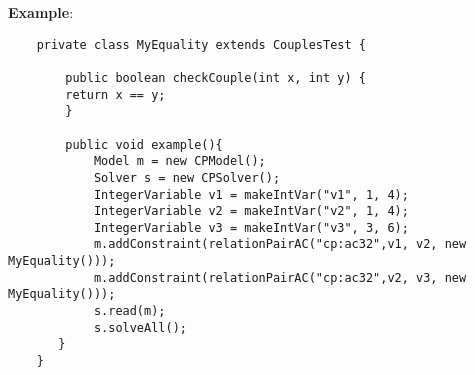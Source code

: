 \textbf{Example}:
\begin{lstlisting}
	private class MyEquality extends CouplesTest {
	
	    public boolean checkCouple(int x, int y) {
	    return x == y;
	    }
	
	    public void example(){
	        Model m = new CPModel();
	        Solver s = new CPSolver();
	        IntegerVariable v1 = makeIntVar("v1", 1, 4);
	        IntegerVariable v2 = makeIntVar("v2", 1, 4);    
	        IntegerVariable v3 = makeIntVar("v3", 3, 6);
	        m.addConstraint(relationPairAC("cp:ac32",v1, v2, new MyEquality()));
	        m.addConstraint(relationPairAC("cp:ac32",v2, v3, new MyEquality()));
	        s.read(m);
	        s.solveAll();
	   }
	}
\end{lstlisting} 
